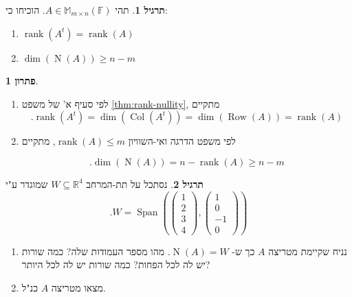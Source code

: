 \documentclass[12pt]{report}
\theoremstyle{plain}
\theoremstyle{definition}
\newtheorem{exercise}{תרגיל}[chapter]
\newtheorem*{solution}{פתרון}
\newcommand{\R}{\mathbb{R}}
\newcommand{\F}{\mathbb{F}}
\DeclareMathOperator{\rank}{rank}
\newcommand{\M}{\mathbb{M}}
\newcommand{\0}{\mathbf{0}}
\DeclareMathOperator{\Span}{Span}
\DeclareMathOperator{\Row}{Row}
\DeclareMathOperator{\Col}{Col}
\DeclareMathOperator{\Null}{N}
\begin{document}
\begin{exercise}
תהי
$A\in\M_{m\times n}(\F)$.
הוכיחו כי:

\begin{enumerate}[label=\alph*.]
\item
$\rank(A^t)=\rank(A)$


\item 
$\dim(\Null(A))\geq n-m$


\end{enumerate}
\end{exercise}

\begin{solution}\
\begin{enumerate}[label=\alph*.]
\item
לפי סעיף א' של משפט
\ref{thm:rank-nullity},
מתקיים
$$
.\rank(A^t)=\dim(\Col(A^t))=\dim(\Row(A))=\rank(A)
$$


\item
לפי משפט הדרגה ואי-השוויון 
$\rank(A)\leq m$,
מתקיים

$$
.\dim(\Null(A))=n-\rank(A)\geq n-m
$$


\end{enumerate}
\end{solution}

\begin{exercise}
נסתכל על תת-המרחב 
$W\subseteq\R^4$
שמוגדר ע"י
$$
.W=\Span\left(\begin{pmatrix}
1 \\
2 \\
3 \\
4
\end{pmatrix},\begin{pmatrix}
1 \\
0 \\
-1 \\
0
\end{pmatrix}\right)
$$

\begin{enumerate}[label=\alph*.]
\item 
נניח שקיימת מטריצה 
$A$
כך ש-
$\Null(A)=W$.
מהו מספר העמודות שלה? כמה שורות יש לה לכל הפחות? כמה שורות יש לה לכל היותר?


\item 
מצאו מטריצה 
$A$
כנ"ל.


\end{enumerate}
\end{exercise}
\end{document}
